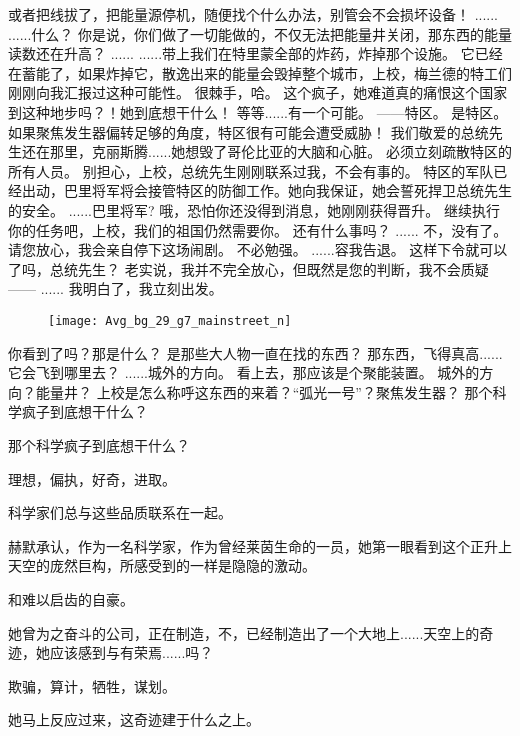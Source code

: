 \documentclass[openany]{book}
\begin{document}
\begin{dialogue}
     或者把线拔了，把能量源停机，随便找个什么办法，别管会不会损坏设备！
     ......
     ......什么？
     你是说，你们做了一切能做的，不仅无法把能量井关闭，那东西的能量读数还在升高？
     ......
     ......带上我们在特里蒙全部的炸药，炸掉那个设施。
     它已经在蓄能了，如果炸掉它，散逸出来的能量会毁掉整个城市，上校，梅兰德的特工们刚刚向我汇报过这种可能性。
     很棘手，哈。
     这个疯子，她难道真的痛恨这个国家到这种地步吗？！她到底想干什么！
     等等......有一个可能。
     ——特区。
     是特区。如果聚焦发生器偏转足够的角度，特区很有可能会遭受威胁！
     我们敬爱的总统先生还在那里，克丽斯腾......她想毁了哥伦比亚的大脑和心脏。
     必须立刻疏散特区的所有人员。
     别担心，上校，总统先生刚刚联系过我，不会有事的。
     特区的军队已经出动，巴里将军将会接管特区的防御工作。她向我保证，她会誓死捍卫总统先生的安全。
     ......巴里将军?
     哦，恐怕你还没得到消息，她刚刚获得晋升。
     继续执行你的任务吧，上校，我们的祖国仍然需要你。
     还有什么事吗？
     ......
     不，没有了。
     请您放心，我会亲自停下这场闹剧。
     不必勉强。
     ......容我告退。
     这样下令就可以了吗，总统先生？
     老实说，我并不完全放心，但既然是您的判断，我不会质疑——
     ......
     我明白了，我立刻出发。
    \begin{figure}[h]
        \centering
        \texttt{[image: Avg\_bg\_29\_g7\_mainstreet\_n]}
    \end{figure}
     你看到了吗？那是什么？
     是那些大人物一直在找的东西？
     那东西，飞得真高......
     它会飞到哪里去？
     ......城外的方向。
     看上去，那应该是个聚能装置。
     城外的方向？能量井？
     上校是怎么称呼这东西的来着？“弧光一号”？聚焦发生器？
     那个科学疯子到底想干什么？
\end{dialogue}\par

那个科学疯子到底想干什么？\par
理想，偏执，好奇，进取。\par
科学家们总与这些品质联系在一起。\par
赫默承认，作为一名科学家，作为曾经莱茵生命的一员，她第一眼看到这个正升上天空的庞然巨构，所感受到的一样是隐隐的激动。\par
和难以启齿的自豪。\par
她曾为之奋斗的公司，正在制造，不，已经制造出了一个大地上......天空上的奇迹，她应该感到与有荣焉......吗？\par
欺骗，算计，牺牲，谋划。\par
她马上反应过来，这奇迹建于什么之上。
\end{document}

